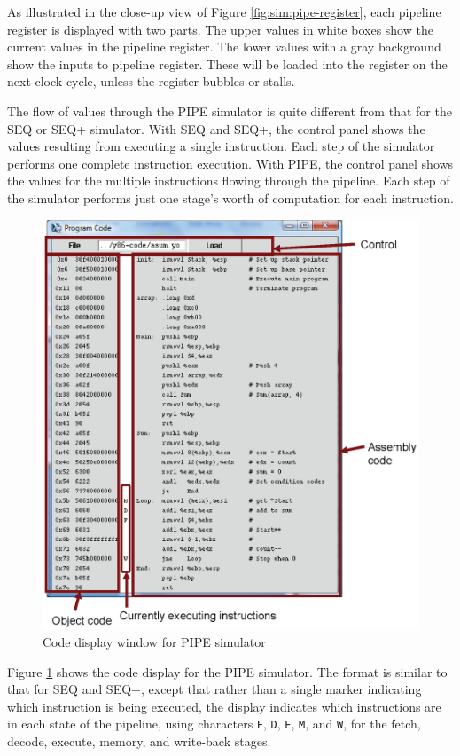 \documentclass[11pt]{article}
\begin{document}
As illustrated in the close-up view of Figure
\ref{fig:sim:pipe-register}, each pipeline register is displayed with
two parts.  The upper values in white boxes show the current values in
the pipeline register.  The lower values with a gray background show
the inputs to pipeline register.  These will be loaded into the
register on the next clock cycle, unless the register bubbles or
stalls.

The flow of values through the PIPE simulator is quite different from
that for the SEQ or SEQ+ simulator.  With SEQ and SEQ+, the control
panel shows the values resulting from executing a single instruction.
Each step of the simulator performs one complete instruction execution.
With PIPE, the control panel shows the values for the multiple
instructions flowing through the pipeline.  Each step of the simulator
performs just one stage's worth of computation for each instruction.

\begin{figure}
\centerline{\includegraphics*[scale=0.8]{pipe-code.eps}}
\caption{Code display window for PIPE simulator}
\label{fig:sim:pipe-code}
\end{figure}

Figure \ref{fig:sim:pipe-code} shows the code display for the PIPE
simulator.  The format is similar to that for SEQ and SEQ+, except
that rather than a single marker indicating which instruction is being
executed, the display indicates which instructions are in each
state of the pipeline, using characters \texttt{F}, \texttt{D},
\texttt{E}, \texttt{M}, and \texttt{W}, for the fetch, decode,
execute, memory, and write-back stages.
\end{document}
